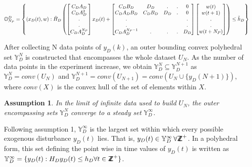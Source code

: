 \documentclass[letterpaper, 10 pt, conference]{ieeeconf}  %
\newcommand*{\ZZ}{%
	\textsf{Z\kern-1ex Z}%
}
\newtheorem{assumption}{Assumption}
\begin{document}
  \begin{table}[t]
   \begin{equation}
   \small
   \mathbb{O}_{N_P}^D=\begin{Bmatrix}(x_D(t),w):\tilde{H}_D\begin{pmatrix}\begin{bmatrix} C_DA_D\\ C_DA_D^2 \\ . \\ . \\ C_DA_D^{N_P}\end{bmatrix}x_D(t) + \begin{bmatrix}
   C_DB_D & D_D & . & . & 0 \\
   C_DA_DB_D & C_DB_D & D_D & . & 0 \\
   . &  &  &  & . \\
   . &  &  &  & . \\
   C_DA_D^{N_P-1} & . & . & . & D_D
   \end{bmatrix}
   \begin{bmatrix}
   w(t) \\ w(t+1) \\ . \\ . \\ w(t+N_P)
   \end{bmatrix}
   \end{pmatrix} \leq \tilde{h}_D
   \end{Bmatrix}
   \label{OND_set}
   \end{equation} 
  \end{table}
 After collecting N data points of $y_D(k)$, an outer bounding convex polyhedral set $\mathbb{Y}_D^N$ is constructed that encompasses the whole dataset $U_N$. As the number of data points in the experiment increase, we obtain $\mathbb{Y}_D^{N} \subseteq \mathbb{Y}_D^{N+1}$ as
 $\mathbb{Y}_D^{N} = conv(U_N)$ and  $\mathbb{Y}_D^{N+1} = conv(U_{N+1})=conv(U_{N} \cup \{y_D(N+1)\} )$, where $conv(X)$ is the convex hull of the set of elements within $X$. 
 \begin{assumption}
 	 In the limit of infinite data used to build $U_N$, the outer encompassing sets $\mathbb{Y}_D^{N}$ converge to a steady set $\mathbb{Y}_D^{\infty}$.
 \end{assumption} 
Following assumption 1, $\mathbb{Y}_D^{\infty}$ is the largest set within which every possible exogenous disturbance $y_D(t)$ lies. That is, $y_D(t) \in \mathbb{Y}_D^{\infty} \hspace{2pt}  \forall \ZZ^{+}$.  In a polyhedral form, this set defining the point wise in time values of $y_D(t)$ is written as $\mathbb{Y}_D^{\infty} = \{y_D(t):H_Dy_D(t) \leq h_D \forall t \in \ZZ^+\}$. \\
\end{document}
